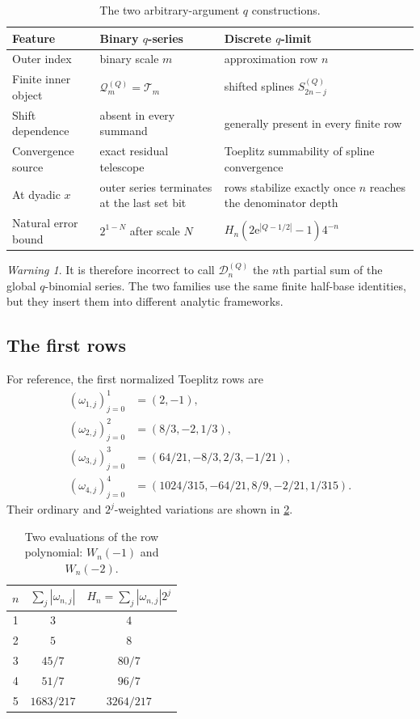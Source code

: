 \documentclass[11pt,oneside]{article}
\theoremstyle{definition}
\theoremstyle{remark}
\newtheorem{warning}[theorem]{Warning}
\newcommand{\e}{\mathrm e}
\begin{document}
\begin{table}[ht]
\centering
\small
\begin{tabularx}{\textwidth}{@{}p{}XX@{}}
\toprule
Feature & Binary $q$-series & Discrete $q$-limit \\
\midrule
Outer index & binary scale $m$ & approximation row $n$ \\
Finite inner object & $\mathcal Q_m^{(Q)}=\mathcal T_m$ & shifted splines $S_{2n-j}^{(Q)}$ \\
Shift dependence & absent in every summand & generally present in every finite row \\
Convergence source & exact residual telescope & Toeplitz summability of spline convergence \\
At dyadic $x$ & outer series terminates at the last set bit & rows stabilize exactly once $n$ reaches the denominator depth \\
Natural error bound & $2^{1-N}$ after scale $N$ & $H_n(2\e^{|Q-1/2|}-1)4^{-n}$ \\
\bottomrule
\end{tabularx}
\caption{The two arbitrary-argument $q$ constructions.}
\label{dyadicweb:tab:two-infinite}
\end{table}

\begin{warning}
It is therefore incorrect to call $\mathcal D_n^{(Q)}$ the $n$th partial sum of the global
$q$-binomial series.  The two families use the same finite half-base identities, but they
insert them into different analytic frameworks.
\end{warning}

\subsection{The first rows}

For reference, the first normalized Toeplitz rows are
\begin{align*}
 (\omega_{1,j})_{j=0}^{1}&=(2,-1),\\
 (\omega_{2,j})_{j=0}^{2}&=(8/3,-2,1/3),\\
 (\omega_{3,j})_{j=0}^{3}&=(64/21,-8/3,2/3,-1/21),\\
 (\omega_{4,j})_{j=0}^{4}&=(1024/315,-64/21,8/9,-2/21,1/315).
\end{align*}
Their ordinary and $2^j$-weighted variations are shown in
\cref{dyadicweb:tab:row-constants}.

\begin{table}[ht]
\centering
\small
\begin{tabular}{@{}c c c@{}}
\toprule
$n$ & $\sum_j|\omega_{n,j}|$ & $H_n=\sum_j|\omega_{n,j}|2^j$ \\
\midrule
1 & $3$ & $4$ \\
2 & $5$ & $8$ \\
3 & $45/7$ & $80/7$ \\
4 & $51/7$ & $96/7$ \\
5 & $1683/217$ & $3264/217$ \\
\bottomrule
\end{tabular}
\caption{Two evaluations of the row polynomial: $W_n(-1)$ and $W_n(-2)$.}
\label{dyadicweb:tab:row-constants}
\end{table}
\end{document}
